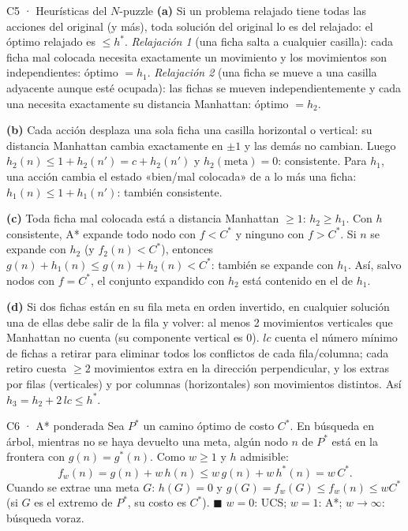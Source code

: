 \begin{solucion}{C5 · Heurísticas del $N$-puzzle}
\textbf{(a)} Si un problema relajado tiene todas las acciones del original (y más), toda solución del
original lo es del relajado: el óptimo relajado es $\le h^*$. \emph{Relajación 1} (una ficha salta a
cualquier casilla): cada ficha mal colocada necesita exactamente un movimiento y los movimientos son
independientes: óptimo $=h_1$. \emph{Relajación 2} (una ficha se mueve a una casilla adyacente aunque
esté ocupada): las fichas se mueven independientemente y cada una necesita exactamente su distancia
Manhattan: óptimo $=h_2$.

\textbf{(b)} Cada acción desplaza una sola ficha una casilla horizontal o vertical: su distancia
Manhattan cambia exactamente en $\pm1$ y las demás no cambian. Luego $h_2(n)\le 1+h_2(n')=c+h_2(n')$ y
$h_2(\text{meta})=0$: consistente. Para $h_1$, una acción cambia el estado «bien/mal colocada» de a lo más
una ficha: $h_1(n)\le1+h_1(n')$: también consistente.

\textbf{(c)} Toda ficha mal colocada está a distancia Manhattan $\ge1$: $h_2\ge h_1$. Con $h$ consistente,
A* expande todo nodo con $f<C^*$ y ninguno con $f>C^*$. Si $n$ se expande con $h_2$ (y $f_2(n)<C^*$),
entonces $g(n)+h_1(n)\le g(n)+h_2(n)<C^*$: también se expande con $h_1$. Así, salvo nodos con $f=C^*$,
el conjunto expandido con $h_2$ está contenido en el de $h_1$.

\textbf{(d)} Si dos fichas están en su fila meta en orden invertido, en cualquier solución una de ellas
debe salir de la fila y volver: al menos 2 movimientos verticales que Manhattan no cuenta (su componente
vertical es 0). $lc$ cuenta el número mínimo de fichas a retirar para eliminar todos los conflictos de
cada fila/columna; cada retiro cuesta $\ge2$ movimientos extra en la dirección perpendicular, y los
extras por filas (verticales) y por columnas (horizontales) son movimientos distintos. Así
$h_3=h_2+2\,lc\le h^*$.
\end{solucion}

\begin{solucion}{C6 · A* ponderada}
Sea $P^*$ un camino óptimo de costo $C^*$. En búsqueda en árbol, mientras no se haya devuelto una meta,
algún nodo $n$ de $P^*$ está en la frontera con $g(n)=g^*(n)$. Como $w\ge1$ y $h$ admisible:
\[f_w(n)=g(n)+w\,h(n)\le w\,g(n)+w\,h^*(n)=w\,C^*.\]
Cuando se extrae una meta $G$: $h(G)=0$ y $g(G)=f_w(G)\le f_w(n)\le wC^*$ (si $G$ es el extremo de $P^*$, su costo es $C^*$). $\blacksquare$
$w=0$: UCS; $w=1$: A*; $w\to\infty$: búsqueda voraz.
\end{solucion}


